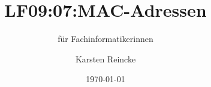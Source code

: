 \documentclass[]{beamer}
\title{LF09:07:MAC-Adressen}
\subtitle{für Fachinformatikerinnen}
\institute{GS-LDK}
\author{Karsten Reincke}
\date{\today}
\def\cfgGl{../../../cfg.gl/}
\begin{document}

\begin{frame}
  \titlepage
\end{frame}






\logo{}
\newpage



%
\end{document}
